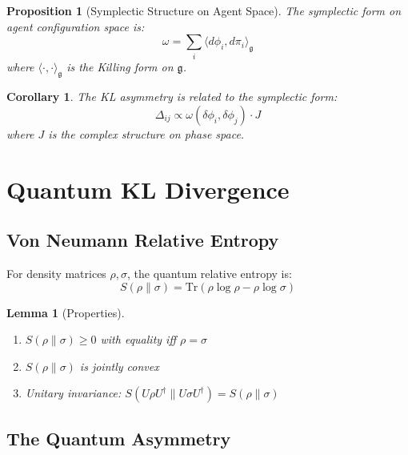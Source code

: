 \documentclass[11pt,a4paper]{article}
\newtheorem{proposition}[theorem]{Proposition}
\newtheorem{lemma}[theorem]{Lemma}
\newtheorem{corollary}[theorem]{Corollary}
\newcommand{\Tr}{\mathrm{Tr}}
\begin{document}
\begin{proposition}[Symplectic Structure on Agent Space]
The symplectic form on agent configuration space is:
\begin{equation}
    \omega = \sum_i \langle d\phi_i, d\pi_i \rangle_{\mathfrak{g}}
\end{equation}
where $\langle \cdot, \cdot \rangle_{\mathfrak{g}}$ is the Killing form on $\mathfrak{g}$.
\end{proposition}

\begin{corollary}
The KL asymmetry is related to the symplectic form:
\begin{equation}
    \Delta_{ij} \propto \omega(\delta\phi_i, \delta\phi_j) \cdot J
\end{equation}
where $J$ is the complex structure on phase space.
\end{corollary}

\section{Quantum KL Divergence}

\subsection{Von Neumann Relative Entropy}

For density matrices $\rho, \sigma$, the quantum relative entropy is:
\begin{equation}
    S(\rho \| \sigma) = \Tr(\rho \log \rho - \rho \log \sigma)
\end{equation}

\begin{lemma}[Properties]
\begin{enumerate}
    \item $S(\rho \| \sigma) \geq 0$ with equality iff $\rho = \sigma$
    \item $S(\rho \| \sigma)$ is jointly convex
    \item Unitary invariance: $S(U\rho U^\dagger \| U\sigma U^\dagger) = S(\rho \| \sigma)$
\end{enumerate}
\end{lemma}

\subsection{The Quantum Asymmetry}
\end{document}
